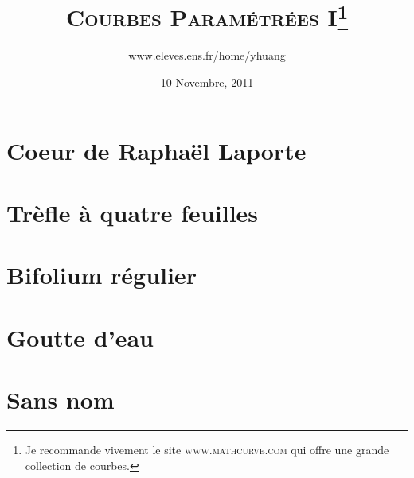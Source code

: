 \documentclass{article}
\begin{document}
\title{\textsc{Courbes Param\'etr\'ees I}\footnote{Je recommande vivement le site \textsc{www.mathcurve.com} qui offre une grande collection de courbes.}}
\author{www.eleves.ens.fr/home/yhuang}
\date{10 Novembre, 2011}

\maketitle

\section{Coeur de Rapha\"el Laporte}

\section{Tr\`efle \`a quatre feuilles}

\section{Bifolium r\'egulier}

\section{Goutte d'eau}

\section{Sans nom}
\end{document}
